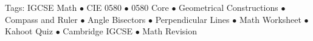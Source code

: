 \documentclass[11pt,a4paper]{article}
\begin{document}
\vspace{14pt}
\begin{center}
  \sffamily\scriptsize\textcolor{textmuted}{
    Tags: IGCSE Math $\bullet$ CIE 0580 $\bullet$ 0580 Core $\bullet$ Geometrical Constructions $\bullet$ Compass and Ruler $\bullet$ Angle Bisectors $\bullet$ Perpendicular Lines $\bullet$ Math Worksheet $\bullet$ Kahoot Quiz $\bullet$ Cambridge IGCSE $\bullet$ Math Revision
  }
\end{center}
\end{document}
